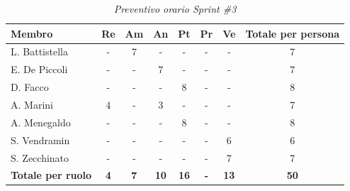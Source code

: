 \documentclass[a4paper, 10pt, colorlinks=true, linkcolor=black, urlcolor=blue, citecolor=blue, hidelinks]{article}
\renewcommand{\arraystretch}{1.2}
\begin{document}
\begin{table}[H]
    \centering
    \renewcommand{\arraystretch}{1.4}
    \begin{tabular}{|l|c|c|c|c|c|c|c|}
        \hline
        \rowcolor{bluBitless!15}
        \textbf{Membro} & \textbf{Re} & \textbf{Am} & \textbf{An} & \textbf{Pt} & \textbf{Pr} & \textbf{Ve} & \textbf{Totale per persona} \\
        \hline
        L. Battistella & - & 7 & - & - & - & - & 7 \\ \hline
        E. De Piccoli & - & - & 7 & - & - & - & 7 \\ \hline
        D. Facco & - & - & - & 8 & - & - & 8 \\ \hline
        A. Marini & 4 & - & 3 & - & - & - & 7 \\ \hline
        A. Menegaldo & - & - & - & 8 & - & - & 8 \\ \hline
        S. Vendramin & - & - & - & - & - & 6 & 6 \\ \hline
        S. Zecchinato & - & - & - & - & - & 7 & 7 \\ \hline
        \rowcolor{bluBitless!8}
        \textbf{Totale per ruolo} & \textbf{4} & \textbf{7} & \textbf{10} & \textbf{16} & \textbf{-} & \textbf{13} & \textbf{50} \\
        \hline
    \end{tabular}
    \caption{\textit{Preventivo orario Sprint \#3}}
\end{table}
\end{document}
